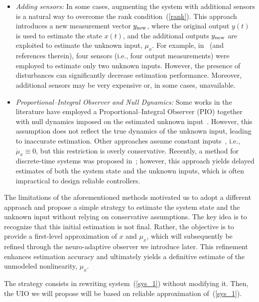 \documentclass{ifacconf}
\def\eqref#1{(\ref{#1})}
\begin{document}
\begin{itemize}
%
\item {\it Adding sensors:} In some cases, augmenting the system with additional sensors is a natural way to overcome the rank condition~\eqref{rank}. This approach introduces a new measurement vector $y_{\rm new}$, where the original output $y(t)$ is used to estimate the state $x(t)$, and the additional outputs $y_{\rm new}$ are exploited to estimate the unknown input, $\mu_{x}$. For example, in~\cite{Phanomchoeng:ASME/TM14} (and references therein), four sensors (i.e., four output measurements) were employed to estimate only two unknown inputs. However, the presence of disturbances can significantly decrease estimation performance. Moreover, additional sensors may be very expensive or, in some cases, unavailable.
%
\item {\it Proportional--Integral Observer and Null Dynamics:} Some works in the literature have employed a Proportional--Integral Observer (PIO) together with null dynamics imposed on the estimated unknown input~\citep{PIO_1995,PIOreview}. However, this assumption does not reflect the true dynamics of the unknown input, leading to inaccurate estimation. Other approaches assume constant inputs~\citep{jeon2020simultaneous}, i.e., $\dot{\mu}_{x} \equiv 0$, but this restriction is overly conservative. Recently, a method for discrete-time systems was proposed in~\cite{nguyen2024cyberattack}; however, this approach yields delayed estimates of both the system state and the unknown inputs, which is often impractical to design reliable controllers.
\end{itemize}

The limitations of the aforementioned methods motivated us to adopt a different approach and propose a simple strategy to estimate the system state and the unknown input without relying on conservative assumptions. The key idea is to recognize that this initial estimation is not final. Rather, the objective is to provide a first-level approximation of $x$ and $\mu_{x}$, which will subsequently be refined through the neuro-adaptive observer we introduce later. This refinement enhances estimation accuracy and ultimately yields a definitive estimate of the unmodeled nonlinearity, $\mu_{x}$.


The strategy consists in rewriting system~\eqref{sys_1} without modifying it. Then, the UIO we will propose will be based on reliable approximation of~\eqref{sys_1}.
\end{document}
